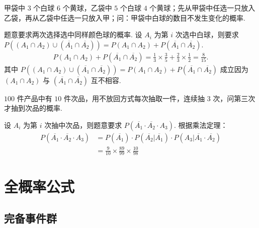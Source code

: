 \documentclass[12pt, a4paper, oneside, UTF8]{ctexbook}
\begin{document}
\begin{example}
    甲袋中 \(3\) 个白球 \(6\) 个黄球，乙袋中 \(5\) 个白球 \(4\) 个黄球；先从甲袋中任选一只放入乙袋，再从乙袋中任选一只放入甲；问：甲袋中白球的数目不发生变化的概率.
\end{example}

\begin{solution}
    题意要求两次选择选中同样颜色球的概率. 设 \(A_i\) 为第 \(i\) 次选中白球，则要求 \(P\left(\left(A_1 \cap A_2\right) \cup \left(\overline{A_1} \cap \overline{A_2}\right)\right) = P\left(A_1 \cap A_2\right) + P\left(\overline{A_1}\cap \overline{A_2}\right)\).
    \begin{align*}
        P\left(A_1 \cap A_2\right) + P\left(\overline{A_1} \cap \overline{A_2}\right) = \frac{1}{3} \times \frac{3}{5} + \frac{2}{3} \times \frac{1}{2} = \frac{8}{15}.
    \end{align*}
    其中 \(P\left(\left(A_1 \cap A_2\right) \cup \left(\overline{A_1} \cap \overline{A_2}\right)\right) = P\left(A_1 \cap A_2\right) + P\left(\overline{A_1}\cap \overline{A_2}\right)\) 成立因为 \(\left(A_1 \cap A_2\right)\) 与 \(\left(\overline{A_1}\cap \overline{A_2}\right)\) 互不相容.
\end{solution}

\begin{example}
    \(100\) 件产品中有 \(10\) 件次品，用不放回方式每次抽取一件，连续抽 \(3\) 次，问第三次才抽到次品的概率.
\end{example}

\begin{solution}
    设 \(A_i\) 为第 \(i\) 次抽中次品，则题意要求 \(P\left(\overline{A_1}\cdot \overline{A_2} \cdot A_3\right)\). 根据乘法定理：
    \begin{align*}
        P\left(\overline{A_1}\cdot \overline{A_2} \cdot A_3\right) &= P\left(\overline{A_1}\right) \cdot P\left(\overline{A_2} | \overline{A_1}\right) \cdot P\left(A_3 | \overline{A_1} \cdot \overline{A_2}\right) \\
        &= \frac{9}{10} \times \frac{89}{99} \times \frac{10}{98}
    \end{align*}
\end{solution}

\clearpage

\section{全概率公式}

\subsection{完备事件群}
\end{document}
